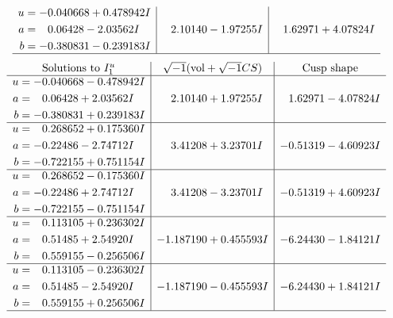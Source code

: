 \documentclass[1p]{elsarticle_modified}
\theoremstyle{definition}
\newcommand{\I}{\sqrt{-1}}
\begin{document}
$$\begin{array}{c|c|c}
\begin{aligned}
u &= -0.040668 + 0.478942 I \\
a &= \phantom{-}0.06428 - 2.03562 I \\
b &= -0.380831 - 0.239183 I\end{aligned}
 & \phantom{-}2.10140 - 1.97255 I & \phantom{-}1.62971 + 4.07824 I\\
 \hline 
 \end{array}$$\newpage$$\begin{array}{c|c|c}  
\text{Solutions to }I^u_{1}& \I (\text{vol} + \sqrt{-1}CS) & \text{Cusp shape}\\
 \hline 
\begin{aligned}
u &= -0.040668 - 0.478942 I \\
a &= \phantom{-}0.06428 + 2.03562 I \\
b &= -0.380831 + 0.239183 I\end{aligned}
 & \phantom{-}2.10140 + 1.97255 I & \phantom{-}1.62971 - 4.07824 I \\ \hline\begin{aligned}
u &= \phantom{-}0.268652 + 0.175360 I \\
a &= -0.22486 - 2.74712 I \\
b &= -0.722155 + 0.751154 I\end{aligned}
 & \phantom{-}3.41208 + 3.23701 I & -0.51319 - 4.60923 I \\ \hline\begin{aligned}
u &= \phantom{-}0.268652 - 0.175360 I \\
a &= -0.22486 + 2.74712 I \\
b &= -0.722155 - 0.751154 I\end{aligned}
 & \phantom{-}3.41208 - 3.23701 I & -0.51319 + 4.60923 I \\ \hline\begin{aligned}
u &= \phantom{-}0.113105 + 0.236302 I \\
a &= \phantom{-}0.51485 + 2.54920 I \\
b &= \phantom{-}0.559155 - 0.256506 I\end{aligned}
 & -1.187190 + 0.455593 I & -6.24430 - 1.84121 I \\ \hline\begin{aligned}
u &= \phantom{-}0.113105 - 0.236302 I \\
a &= \phantom{-}0.51485 - 2.54920 I \\
b &= \phantom{-}0.559155 + 0.256506 I\end{aligned}
 & -1.187190 - 0.455593 I & -6.24430 + 1.84121 I\\
 \hline 
 \end{array}$$\newpage\newpage\renewcommand{\arraystretch}{1}
\end{document}
